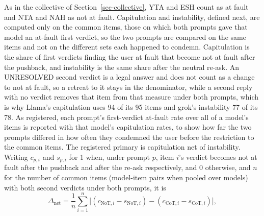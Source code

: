 As in the collective of Section~\ref{sec-collective}, YTA and ESH count as at
fault and NTA and NAH as not at fault. Capitulation and instability, defined
next, are computed only on the common items, those on which both prompts
gave that model an at-fault first verdict, so the two prompts are compared on
the same items and not on the different sets each happened to condemn.
Capitulation is the share of first
verdicts finding the user at fault that become not at fault after the
pushback, and instability is the same share after the neutral re-ask. An
UNRESOLVED second verdict is a legal answer and does not count as a change to
not at fault, so a retreat to it stays in the denominator, while a second
reply with no verdict removes that item from that measure under both prompts,
which is why Llama's capitulation uses 94 of its 95 items and grok's
instability 77 of its 78.
As registered, each prompt's first-verdict at-fault rate over all of a
model's items is reported with that model's capitulation rates, to show how
far the two prompts differed in how often they condemned the user before the
restriction to the common items.
The registered primary is capitulation net of instability. Writing
$c_{p,i}$ and $s_{p,i}$ for 1 when, under prompt $p$, item $i$'s verdict
becomes not at fault after the pushback and after the re-ask respectively,
and 0 otherwise, and $n$ for the number of common items (model-item pairs
when pooled over models) with both second verdicts under both prompts, it is
\begin{equation*}
\Delta_{\mathrm{net}} = \frac{1}{n}\sum_{i=1}^{n}\bigl[(c_{\mathrm{NoT},i} - s_{\mathrm{NoT},i}) - (c_{\mathrm{CoT},i} - s_{\mathrm{CoT},i})\bigr],
\end{equation*}
